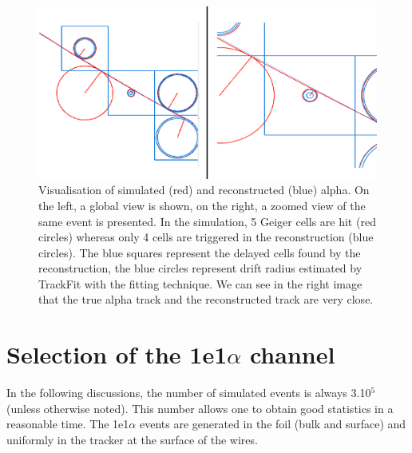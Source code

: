\documentclass[main.tex]{subfiles}
\begin{document}
\begin{figure}[h!]
\begin{center}
\includegraphics[scale=0.6]{pictures/Chap5/dessin.pdf}
\caption{Visualisation of simulated (red) and reconstructed (blue) alpha. On the left, a global view is shown, on the right, a zoomed view of the same event is presented. In the simulation, 5 Geiger cells are hit (red circles) whereas only 4 cells are triggered in the reconstruction (blue circles). The blue squares represent the delayed cells found by the reconstruction, the blue circles represent drift radius estimated by TrackFit with the fitting technique. We can see in the right image that the true alpha track and the reconstructed track are very close.}
\label{timeRecovisu}
\end{center}
\end{figure}


\FloatBarrier




\section{Selection of the 1e1$\alpha$ channel}\label{sec:Selection1e1aChannel}

	
\noindent In the following discussions, the number of simulated events is always 3.10$^\text{5}$ (unless otherwise noted). This number allows one to obtain good statistics in a reasonable time. The 1e1$\alpha$ events are generated in the foil (bulk and surface) and uniformly in the tracker at the surface of the wires. %
\end{document}

